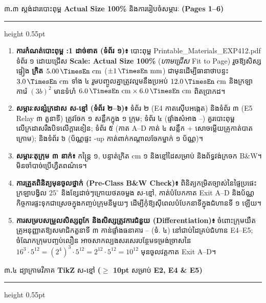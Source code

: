 \documentclass[a4paper,12pt]{article}
\newcommand{\en}[1]{{\TimesEn #1}}
\newcommand{\enbf}[1]{{\TimesEn\textbf{#1}}}
\newcommand{\unit}[1]{\,\text{\en{#1}}}
\newcommand{\cnum}[1]{{\TimesEn\fontsize{10.5pt}{12pt}\selectfont\ding{\numexpr181+#1\relax}}}
\newcommand{\subsectitle}[1]{{\muol\fontsize{11.5pt}{18.5pt}\selectfont #1}}
\newcommand{\subsec}[1]{%
  \Needspace{1.7cm}%
  \vspace{3pt}%
  \subsectitle{#1}\par%
  \vspace{-2pt}%
  {\color{black}\hrule height 0.55pt}%
  \vspace{3pt}%
}
\begin{document}
\subsec{៣\enbf{.}៣ ស្តង់ដារបោះពុម្ព \enbf{Actual Size 100\%} និងការរៀបចំសម្ភារៈ \enbf{(Pages 1--6)}}

\begin{enumerate}[leftmargin=0.65cm]
  \item \textbf{ការកំណត់បោះពុម្ព \en{1:1} ដាច់ខាត (ទំព័រ ១)៖} បោះពុម្ព \en{Printable\_Materials\_EXP412.pdf} ទំព័រ ១ ដោយជ្រើស \textbf{\en{Scale: Actual Size 100\%}} (\textit{ហាមជ្រើស} \en{Fit to Page}) រួចឱ្យសិស្សផ្ទៀង \textbf{ក្រិត $5.00\unit{cm}$} ($\pm 1\unit{mm}$) ជាមុនដើម្បីធានាថាបន្ទះ $3.0\unit{cm}$ ទាំង ៤ រួមបញ្ចូលគ្នាត្រូវល្មមនឹងប្រអប់ $12.0\unit{cm}$ និងក្រឡាការ៉េ $(3b)^2$ មានទំហំ $6.0\unit{cm}\times 6.0\unit{cm}$ ពិតប្រាកដ។
  \item \textbf{សម្ភារៈសន្សំក្រដាស ស-ខ្មៅ (ទំព័រ ២--៦)៖} ទំព័រ ២ (\en{E4} កាតស៊ើបអង្កេត) និងទំព័រ ៣ (\en{E5 Relay} ៣ តួនាទី) ត្រូវចែក ១ សន្លឹកក្នុង ១ ក្រុម; ទំព័រ ៤ (ផ្ទាំងសំអាង \cnum{1}--\cnum{5}) គួរបោះពុម្ពលើក្រដាសរឹងបិទលើក្ដារខៀន; ទំព័រ ៥ (កាត \en{A--D} កាត់ ៤ សន្លឹក + សោចម្លើយគ្រូកាត់បាតក្រោម); និងទំព័រ ៦ (ប័ណ្ណផ្ទះ \en{2-up} កាត់ពាក់កណ្ដាលចែកម្នាក់ ១ ប័ណ្ណ)។
  \item \textbf{សម្ភារៈតុក្រុម ៣ នាក់៖} កន្ត្រៃ ១, បន្ទាត់ក្រិត \en{cm} ១ និងខ្មៅដៃសម្រាប់ \en{[tracing]} និងព័ទ្ធវង់ក្រចក \en{B\&W}។ មិនចាំបាច់ប្រើហ្វឺតពណ៌ទេ។
  \item \textbf{ការត្រួតពិនិត្យមុនចូលថ្នាក់ \en{(Pre-Class B\&W Check)}៖} ពិនិត្យកម្រិតច្បាស់នៃផ្ទៃប្រផេះក្រឡាបង្វិល $25^\circ$ និងខ្សែដាច់ៗក្រោយថតចម្លង ស-ខ្មៅ, កាត់បំបែកកាត \en{Exit A--D} និងប័ណ្ណកិច្ចការផ្ទះទុកជាស្រេចក្នុងកញ្ចប់ក្រុមនីមួយៗ ដើម្បីកុំឱ្យស៊ីពេលបំបែកនាទីក្នុងជំហានទី ១ ឡើយ។
  \item \textbf{ការសម្របសម្រួលសិស្សពូកែ និងសិស្សត្រូវការជំនួយ \en{(Differentiation)}៖} ចំពោះក្រុមយឺត គ្រូអនុញ្ញាតឱ្យសមាជិកតួនាទី ៣ កាន់ផ្ទាំងធនាគារ \cnum{1}--\cnum{5} (ទំ. ៤) នៅជាប់ដៃគ្រប់ជំហាន \en{E4--E5}; ចំណែកក្រុមបញ្ចប់លឿន អាចសាកល្បងសរសេរបន្ថែមទម្រង់ច្រាសនៃ $16^3\cdot 5^{12} = (2^4)^3\cdot 5^{12} = 2^{12}\cdot 5^{12} = 10^{12}$ មុនចូលវគ្គកាត \en{Exit A--D}។
\end{enumerate}

\subsec{៣\enbf{.}៤ ដ្យាក្រាមវិភាគ \enbf{TikZ} ស\enbf{-}ខ្មៅ \enbf{($\ge$ 10pt} សម្រាប់ \enbf{E2, E4 \& E5)}}
\end{document}

